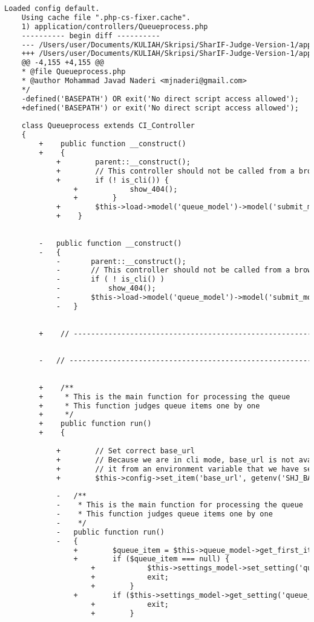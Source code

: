 \begin{lstlisting}[language=diff, caption=Perubahan pada kode Queueprocess.php]
	Loaded config default.
	Using cache file ".php-cs-fixer.cache".
	1) application/controllers/Queueprocess.php
	---------- begin diff ----------
	--- /Users/user/Documents/KULIAH/Skripsi/SharIF-Judge-Version-1/application/controllers/Queueprocess.php
	+++ /Users/user/Documents/KULIAH/Skripsi/SharIF-Judge-Version-1/application/controllers/Queueprocess.php
	@@ -4,155 +4,155 @@
	* @file Queueprocess.php
	* @author Mohammad Javad Naderi <mjnaderi@gmail.com>
	*/
	-defined('BASEPATH') OR exit('No direct script access allowed');
	+defined('BASEPATH') or exit('No direct script access allowed');
	
	class Queueprocess extends CI_Controller
	{
		+    public function __construct()
		+    {
			+        parent::__construct();
			+        // This controller should not be called from a browser
			+        if (! is_cli()) {
				+            show_404();
				+        }
			+        $this->load->model('queue_model')->model('submit_model');
			+    }
		
		
		-	public function __construct()
		-	{
			-		parent::__construct();
			-		// This controller should not be called from a browser
			-		if ( ! is_cli() )
			-			show_404();
			-		$this->load->model('queue_model')->model('submit_model');
			-	}
		
		
		+    // ------------------------------------------------------------------------
		
		
		-	// ------------------------------------------------------------------------
		
		
		+    /**
		+     * This is the main function for processing the queue
		+     * This function judges queue items one by one
		+     */
		+    public function run()
		+    {
			
			+        // Set correct base_url
			+        // Because we are in cli mode, base_url is not available, and we get
			+        // it from an environment variable that we have set in shj_helper.php
			+        $this->config->set_item('base_url', getenv('SHJ_BASE_URL'));
			
			-	/**
			-	 * This is the main function for processing the queue
			-	 * This function judges queue items one by one
			-	 */
			-	public function run()
			-	{
				+        $queue_item = $this->queue_model->get_first_item();
				+        if ($queue_item === null) {
					+            $this->settings_model->set_setting('queue_is_working', '0');
					+            exit;
					+        }
				+        if ($this->settings_model->get_setting('queue_is_working')) {
					+            exit;
					+        }
				

\end{lstlisting}
